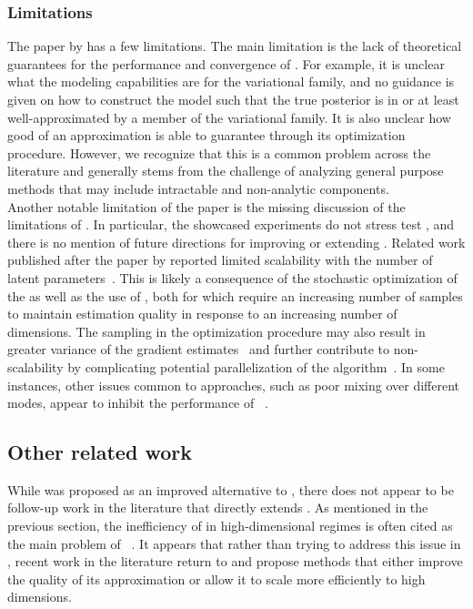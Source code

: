 \documentclass[10pt]{article}
\begin{document}
\subsubsection{Limitations}

The paper by \citet{Titsias:2019} has a few limitations. The main limitation is the lack of theoretical guarantees for the performance and convergence of \uivi. For example, it is unclear what the modeling capabilities are for the \uivi variational family, and no guidance is given on how to construct the model such that the true posterior is in or at least well-approximated by a member of the variational family. It is also unclear how good of an approximation \uivi is able to guarantee through its optimization procedure. However, we recognize that this is a common problem across the \vi literature and generally stems from the challenge of analyzing general purpose methods that may include intractable and non-analytic components.
\\

Another notable limitation of the paper is the missing discussion of the limitations of \uivi. In particular, the showcased experiments do not stress test \uivi, and there is no mention of future directions for improving or extending \uivi. Related work published after the paper by \citet{Titsias:2019} reported limited scalability with the number of latent parameters~\citep{Molchanova:2019,Moens:2021}. This is likely a consequence of the stochastic optimization of the \elbo as well as the use of \mcmc, both for which require an increasing number of samples to maintain estimation quality in response to an increasing number of dimensions. The \mcmc sampling in the \uivi optimization procedure may also result in greater variance of the \elbo gradient estimates~\citep{Betancourt:2015} and further contribute to non-scalability by complicating potential parallelization of the algorithm~\citep{Sobolev:2019}. In some instances, other issues common to \mcmc approaches, such as poor mixing over different modes, appear to inhibit the performance of \uivi~\citep{Sobolev:2019}.


\subsection{Other related work} \label{an:postpaper}

While \uivi was proposed as an improved alternative to \sivi, there does not appear to be follow-up work in the literature that directly extends \uivi. As mentioned in the previous section, the inefficiency of \mcmc in high-dimensional regimes is often cited as the main problem of \uivi~\citep{Molchanova:2019,Moens:2021}. It appears that rather than trying to address this issue in \uivi, recent work in the literature return to \sivi and propose methods that either improve the quality of its approximation or allow it to scale more efficiently to high dimensions.
\\
\end{document}
